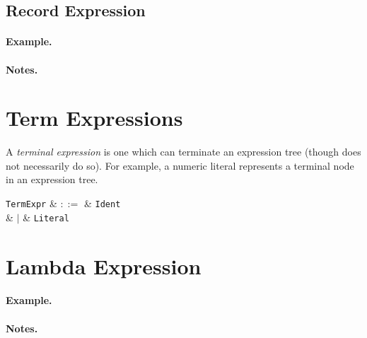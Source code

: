 \subsection{Record Expression}
\label{c_expr_record}

\begin{syntax}
\end{syntax}

\paragraph{Example.}

\paragraph{Notes.}


\section{Term Expressions}
\label{c_expr_term}

A {\em terminal expression} is one which can terminate an expression tree (though does not necessarily do so).  For example, a numeric literal represents a terminal node in an expression tree.

\begin{syntax}
  \verb+TermExpr+ & $::=$ & \verb+Ident+\\
  & $|$ & \verb+Literal+\\
\end{syntax}



\section{Lambda Expression}
\label{c_expr_lambda}

\begin{syntax}
\end{syntax}

\paragraph{Example.}

\paragraph{Notes.}

